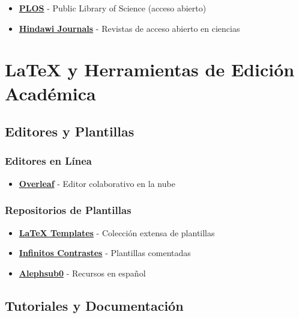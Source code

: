 \documentclass[
  jou,
  floatsintext,
  longtable,
  a4paper,
  nolmodern,
  notxfonts,
  notimes,
  12pt,
  colorlinks=true,linkcolor=blue,citecolor=blue,urlcolor=blue]{apa7}
\providecommand{\tightlist}{%
  \setlength{\itemsep}{0pt}\setlength{\parskip}{0pt}}
\begin{document}
\begin{itemize}
\tightlist
\item
  \textbf{\href{https://plos.org/}{PLOS}} - Public Library of Science
  (acceso abierto)
\item
  \textbf{\href{https://www.hindawi.com/journals/}{Hindawi Journals}} -
  Revistas de acceso abierto en ciencias
\end{itemize}

\section{LaTeX y Herramientas de Edición
Académica}\label{latex-y-herramientas-de-ediciuxf3n-acaduxe9mica}

\subsection{Editores y Plantillas}\label{editores-y-plantillas}

\subsubsection{Editores en Línea}\label{editores-en-luxednea}

\begin{itemize}
\tightlist
\item
  \textbf{\href{https://www.overleaf.com/}{Overleaf}} - Editor
  colaborativo en la nube
\end{itemize}

\subsubsection{Repositorios de
Plantillas}\label{repositorios-de-plantillas}

\begin{itemize}
\tightlist
\item
  \textbf{\href{http://www.latextemplates.com/}{LaTeX Templates}} -
  Colección extensa de plantillas
\item
  \textbf{\href{https://imalexissaez.github.io/2021/09/01/algunas-plantillas-de-latex-interesantes/}{Infinitos
  Contrastes}} - Plantillas comentadas
\item
  \textbf{\href{https://alephsub0.org/recursos/}{Alephsub0}} - Recursos
  en español
\end{itemize}

\subsection{Tutoriales y
Documentación}\label{tutoriales-y-documentaciuxf3n}
\end{document}

